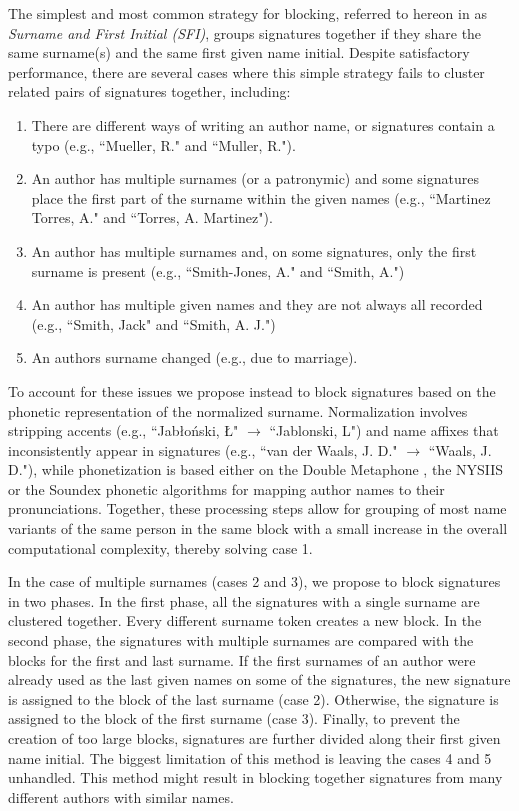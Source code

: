 \documentclass[runningheads,a4paper]{llncs}
\makeatletter
\newcommand*{\eg}{e.g.\@\xspace}
\makeatother
\begin{document}
The simplest and most common strategy for blocking, referred to hereon in as \textit{Surname and First Initial (SFI)},
groups signatures together if they share the same surname(s) and the same first
given name initial.
Despite satisfactory performance, there are several cases where this simple strategy fails to cluster related pairs of signatures together, including:

\begin{enumerate}
  \item There are different
  ways of writing an author name, or signatures contain a typo
  (\eg, ``Mueller, R." and ``Muller, R.").

  \item An author has multiple surnames (or a patronymic) and some signatures place the first part of the surname within the given names (\eg, ``Martinez Torres, A." and ``Torres, A. Martinez").

  \item An author has multiple surnames and, on some signatures, only the first surname is
  present (\eg, ``Smith-Jones, A." and ``Smith, A.")

  \item An author has multiple given names and they are not always all recorded (\eg,
  ``Smith, Jack" and ``Smith, A. J.")

  \item An authors surname changed (\eg, due to marriage).
\end{enumerate}


To account for these issues we propose instead to block signatures based on the
phonetic representation of the normalized surname.
Normalization involves stripping accents (\eg, ``Jab\l{}o\'nski, \L{}" $\rightarrow$ ``Jablonski, L") and name
affixes that inconsistently appear in signatures (\eg, ``van der Waals, J. D."
$\rightarrow$ ``Waals, J. D."), while phonetization is based either on the
Double Metaphone \cite{doublemetaphone}, the NYSIIS \cite{nysiis} or the
Soundex \cite{Soundex} phonetic algorithms for mapping author names to their pronunciations.
Together, these processing steps allow for grouping of most name variants of the same
person in the same block with a small increase in the overall computational complexity, thereby solving case 1.

In the case of multiple surnames (cases 2 and 3), we propose to block
signatures in two phases.
In the first phase, all the signatures with a single surname are clustered together.
Every different surname token creates a new block.
In the second phase, the signatures with multiple surnames are compared
with the blocks for the first and last surname.
If the first surnames of an author were already used as the last given names on some of the signatures, the
new signature is assigned to the block of the last surname (case 2).
Otherwise, the signature is assigned to the block of the first surname (case 3).
Finally, to prevent the creation of too large blocks, signatures are further divided
along their first given name initial.
The biggest limitation of this method is leaving the cases 4 and 5 unhandled.
This method might result in blocking together signatures from many different authors
with similar names.
\end{document}
